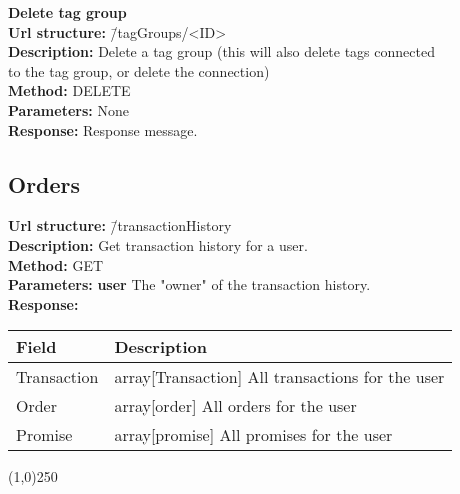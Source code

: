 \documentclass[11pt]{article}
\begin{document}
\begin{tabbing}
\textbf{Delete tag group} \\
\textcolor{black!60}{\textbf{Url structure:}} \hspace{0.2in} \= /tagGroups/<ID> \\
\textcolor{black!60}{\textbf{Description:}}  \> Delete a tag group (this will also delete tags connected \\ \> to the tag group, or delete the connection) \\
\textcolor{black!60}{\textbf{Method:}} \> DELETE \\
\textcolor{black!60}{\textbf{Parameters:}} \> None \\
\textcolor{black!60}{\textbf{Response:}} \> Response message.
\end{tabbing}

\subsection{Orders}
\label{sec-1-5}

\begin{tabbing}
\textcolor{black!60}{\textbf{Url structure:}} \hspace{0.2in} \= /transactionHistory \\
\textcolor{black!60}{\textbf{Description:}}  \> Get transaction history for a user. \\
\textcolor{black!60}{\textbf{Method:}} \> GET \\
\textcolor{black!60}{\textbf{Parameters:}} \> \textbf{user} The "owner" of the transaction history. \\
\textcolor{black!60}{\textbf{Response:}} \\ \>
\begin{tabular}{|l|l|}
\hline
 Field        &  Description                                       \\
\hline
 Transaction  &  array[Transaction] All transactions for the user  \\
 Order        &  array[order] All orders for the user              \\
 Promise      &  array[promise] All promises for the user          \\
\hline
\end{tabular}
\end{tabbing}

\begin{center}\line(1,0){250}\end{center}
\end{document}
